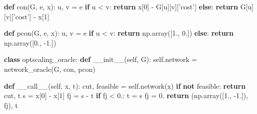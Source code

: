\documentclass[10pt,ignorenonframetext,serif,onlymath]{beamer}
\newenvironment{Shaded}{}{}
\newcommand{\ControlFlowTok}[1]{\textcolor[rgb]{0.00,0.44,0.13}{\textbf{#1}}}
\newcommand{\DecValTok}[1]{\textcolor[rgb]{0.25,0.63,0.44}{#1}}
\newcommand{\FloatTok}[1]{\textcolor[rgb]{0.25,0.63,0.44}{#1}}
\newcommand{\FunctionTok}[1]{\textcolor[rgb]{0.02,0.16,0.49}{#1}}
\newcommand{\KeywordTok}[1]{\textcolor[rgb]{0.00,0.44,0.13}{\textbf{#1}}}
\newcommand{\NormalTok}[1]{#1}
\newcommand{\OperatorTok}[1]{\textcolor[rgb]{0.40,0.40,0.40}{#1}}
\newcommand{\StringTok}[1]{\textcolor[rgb]{0.25,0.44,0.63}{#1}}
\newcommand{\VariableTok}[1]{\textcolor[rgb]{0.10,0.09,0.49}{#1}}
\begin{document}
\begin{frame}[fragile]

\begin{Shaded}
\begin{Highlighting}[]
\KeywordTok{def}\NormalTok{ con(G, e, x):}
\NormalTok{    u, v }\OperatorTok{=}\NormalTok{ e}
    \ControlFlowTok{if}\NormalTok{ u }\OperatorTok{<}\NormalTok{ v: }\ControlFlowTok{return}\NormalTok{ x[}\DecValTok{0}\NormalTok{] }\OperatorTok{-}\NormalTok{ G[u][v][}\StringTok{'cost'}\NormalTok{]}
    \ControlFlowTok{else}\NormalTok{: }\ControlFlowTok{return}\NormalTok{ G[u][v][}\StringTok{'cost'}\NormalTok{] }\OperatorTok{-}\NormalTok{ x[}\DecValTok{1}\NormalTok{]}

\KeywordTok{def}\NormalTok{ pcon(G, e, x):}
\NormalTok{    u, v }\OperatorTok{=}\NormalTok{ e}
    \ControlFlowTok{if}\NormalTok{ u }\OperatorTok{<}\NormalTok{ v: }\ControlFlowTok{return}\NormalTok{ np.array([}\FloatTok{1.}\NormalTok{, }\FloatTok{0.}\NormalTok{])}
    \ControlFlowTok{else}\NormalTok{: }\ControlFlowTok{return}\NormalTok{ np.array([}\FloatTok{0.}\NormalTok{, }\FloatTok{-1.}\NormalTok{])}

\KeywordTok{class}\NormalTok{ optscaling_oracle:}
    \KeywordTok{def} \FunctionTok{__init__}\NormalTok{(}\VariableTok{self}\NormalTok{, G):}
        \VariableTok{self}\NormalTok{.network }\OperatorTok{=}\NormalTok{ network_oracle(G, con, pcon)}

    \KeywordTok{def} \FunctionTok{__call__}\NormalTok{(}\VariableTok{self}\NormalTok{, x, t):}
\NormalTok{        cut, feasible }\OperatorTok{=} \VariableTok{self}\NormalTok{.network(x)}
        \ControlFlowTok{if} \KeywordTok{not}\NormalTok{ feasible: }\ControlFlowTok{return}\NormalTok{ cut, t}
\NormalTok{        s }\OperatorTok{=}\NormalTok{ x[}\DecValTok{0}\NormalTok{] }\OperatorTok{-}\NormalTok{ x[}\DecValTok{1}\NormalTok{]}
\NormalTok{        fj }\OperatorTok{=}\NormalTok{ s }\OperatorTok{-}\NormalTok{ t}
        \ControlFlowTok{if}\NormalTok{ fj }\OperatorTok{<} \FloatTok{0.}\NormalTok{:}
\NormalTok{            t }\OperatorTok{=}\NormalTok{ s}
\NormalTok{            fj }\OperatorTok{=} \FloatTok{0.}
        \ControlFlowTok{return}\NormalTok{ (np.array([}\FloatTok{1.}\NormalTok{, }\FloatTok{-1.}\NormalTok{]), fj), t}
\end{Highlighting}
\end{Shaded}

\end{frame}
\end{document}
